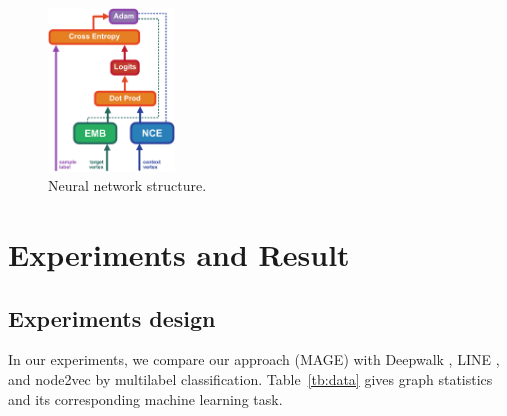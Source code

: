 \documentclass[letterpaper]{article}
\begin{document}
            \begin{figure}
                \centering
                \includegraphics[width=0.3\textwidth]{fig8_nn}
                \caption{Neural network structure.}
                \label{fig:mage}
            \end{figure}

    \section{Experiments and Result}

        \subsection{Experiments design}
            
            In our experiments, we compare our approach (MAGE) with Deepwalk \cite{deepwalk}, 
            LINE \cite{line}, and node2vec \cite{node2vec} by multilabel classification. 
            Table~\ref{tb:data} gives graph statistics and its corresponding machine learning task. 

            \begin{table}
                \centering
                \label{tb:data}
                \caption{Dataset statistics}
            \end{table}
\end{document}
